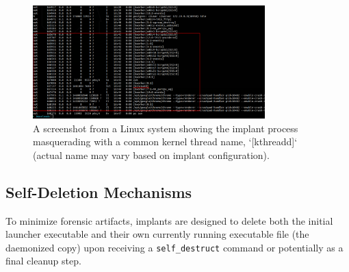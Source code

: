 \begin{figure}[H]
    \centering
    \includegraphics[width=0.8\textwidth]{../screenshots/linux_process_list.png} %
    \caption{A screenshot from a Linux system showing the implant process masquerading with a common kernel thread name, `[kthreadd]` (actual name may vary based on implant configuration).}
    \label{fig:linux_process_masquerade}
\end{figure}

\subsection{Self-Deletion Mechanisms}
To minimize forensic artifacts, implants are designed to delete both the initial launcher executable and their own currently running executable file (the daemonized copy) upon receiving a \texttt{self\_destruct} command or potentially as a final cleanup step.

